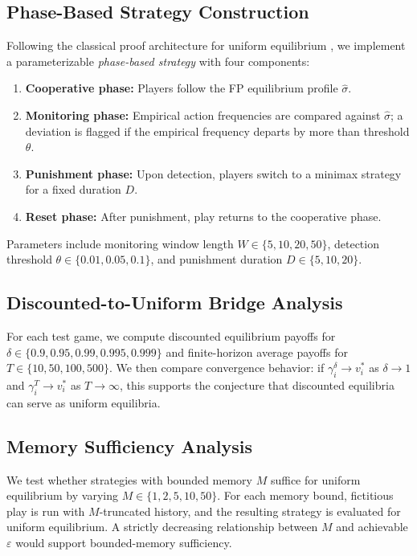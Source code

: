 \documentclass[11pt,a4paper]{article}
\theoremstyle{definition}
\newcommand{\eps}{\varepsilon}
\begin{document}
\subsection{Phase-Based Strategy Construction}\label{sec:method:phase}

Following the classical proof architecture for uniform equilibrium \citep{abreu1990toward,vieille2000a}, we implement a parameterizable \emph{phase-based strategy} with four components:

\begin{enumerate}[leftmargin=1.5em]
    \item \textbf{Cooperative phase:} Players follow the FP equilibrium profile $\hat{\sigma}$.
    \item \textbf{Monitoring phase:} Empirical action frequencies are compared against $\hat{\sigma}$; a deviation is flagged if the empirical frequency departs by more than threshold $\theta$.
    \item \textbf{Punishment phase:} Upon detection, players switch to a minimax strategy for a fixed duration $D$.
    \item \textbf{Reset phase:} After punishment, play returns to the cooperative phase.
\end{enumerate}

Parameters include monitoring window length $W \in \{5, 10, 20, 50\}$, detection threshold $\theta \in \{0.01, 0.05, 0.1\}$, and punishment duration $D \in \{5, 10, 20\}$.

\subsection{Discounted-to-Uniform Bridge Analysis}\label{sec:method:bridge}

For each test game, we compute discounted equilibrium payoffs for $\delta \in \{0.9, 0.95, 0.99, 0.995, 0.999\}$ and finite-horizon average payoffs for $T \in \{10, 50, 100, 500\}$.
We then compare convergence behavior: if $\gamma_i^\delta \to v_i^*$ as $\delta \to 1$ and $\gamma_i^T \to v_i^*$ as $T \to \infty$, this supports the conjecture that discounted equilibria can serve as uniform equilibria.

\subsection{Memory Sufficiency Analysis}\label{sec:method:memory}

We test whether strategies with bounded memory $M$ suffice for uniform equilibrium by varying $M \in \{1, 2, 5, 10, 50\}$.
For each memory bound, fictitious play is run with $M$-truncated history, and the resulting strategy is evaluated for uniform equilibrium.
A strictly decreasing relationship between $M$ and achievable $\eps$ would support bounded-memory sufficiency.
\end{document}
